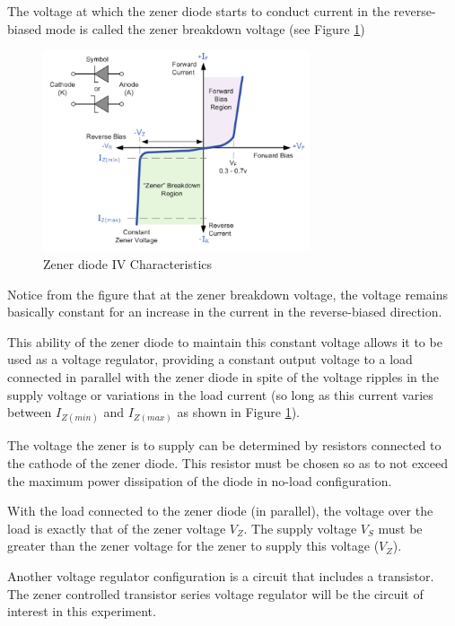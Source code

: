 \documentclass[12pt, a4paper]{article}
\begin{document}
		The voltage at which the zener diode starts to conduct current in the reverse-biased mode is called the zener breakdown voltage (see Figure \ref{fig:zener_iv_curve})

		\begin{figure}[H]
			\centering
			\includegraphics[width=0.7\textwidth]{Images/Zener_IV_Curve.png}
			\caption{Zener diode IV Characteristics}
			\label{fig:zener_iv_curve}
		\end{figure}

		Notice from the figure that at the zener breakdown voltage, the voltage remains basically constant for an increase in the current in the reverse-biased direction.

		This ability of the zener diode to maintain this constant voltage allows it to be used as a voltage regulator, providing a constant output voltage to a load connected in parallel with the zener diode in spite of the voltage ripples in the supply voltage or variations in the load current (so long as this current varies between $I_{Z(min)}$ and $I_{Z(max)}$ as shown in Figure \ref{fig:zener_iv_curve}).

		The voltage the zener is to supply can be determined by resistors connected to the cathode of the zener diode. This resistor must be chosen so as to not exceed the maximum power dissipation of the diode in no-load configuration.

		With the load connected to the zener diode (in parallel), the voltage over the load is exactly that of the zener voltage $V_Z$. The supply voltage $V_S$ must be greater than the zener voltage for the zener to supply this voltage ($V_Z$).

		Another voltage regulator configuration is a circuit that includes a transistor. The zener controlled transistor series voltage regulator will be the circuit of interest in this experiment.
\end{document}
